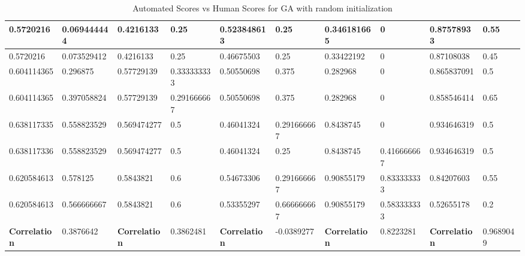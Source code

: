 \begin{landscape}
\begin{table}[!ht]
\begin{tabular}{|p{0.8in}|p{0.8in}|p{0.8in}|p{0.8in}|p{0.8in}|p{0.8in}|p{0.8in}|p{0.8in}|p{0.8in}|p{0.8in}|}
		\hline
		0.5720216 & 0.069444444 & 0.4216133 & 0.25 & 0.523848613 & 0.25 & 0.346181665 & 0 & 0.87578933 & 0.55\\
		\hline
		0.5720216 & 0.073529412 & 0.4216133 & 0.25 & 0.46675503 & 0.25 & 0.33422192 & 0 & 0.87108038 & 0.45\\
		\hline
		0.604114365 & 0.296875 & 0.57729139 & 0.333333333 & 0.50550698 & 0.375 & 0.282968 & 0 & 0.865837091 & 0.5\\
		\hline
		0.604114365 & 0.397058824 & 0.57729139 & 0.291666667 & 0.50550698 & 0.375 & 0.282968 & 0 & 0.858546414 & 0.65\\
		\hline
		0.638117335 & 0.558823529 & 0.569474277 & 0.5 & 0.46041324 & 0.291666667 & 0.8438745 & 0 & 0.934646319 & 0.5\\
		\hline
		0.638117336 & 0.558823529 & 0.569474277 & 0.5 & 0.46041324 & 0.25 & 0.8438745 & 0.416666667 & 0.934646319 & 0.5\\
		\hline
		0.620584613 & 0.578125 & 0.5843821 & 0.6 & 0.54673306 & 0.291666667 & 0.90855179 & 0.833333333 & 0.84207603 & 0.55\\
		\hline
		0.620584613 & 0.566666667 & 0.5843821 & 0.6 & 0.53355297 & 0.666666667 & 0.90855179 & 0.583333333 & 0.52655178 & 0.2\\
		\hline
		\textbf{Correlation} & 0.3876642 & \textbf{Correlation} & 0.3862481 & \textbf{Correlation} & -0.0389277 & \textbf{Correlation} & 0.8223281 & \textbf{Correlation} & 0.9689049\\
		\hline
	\end{tabular}
	\caption{Automated Scores vs Human Scores for GA with random initialization}
	\label{Table:randomScores}
\end{table}
\end{landscape}

